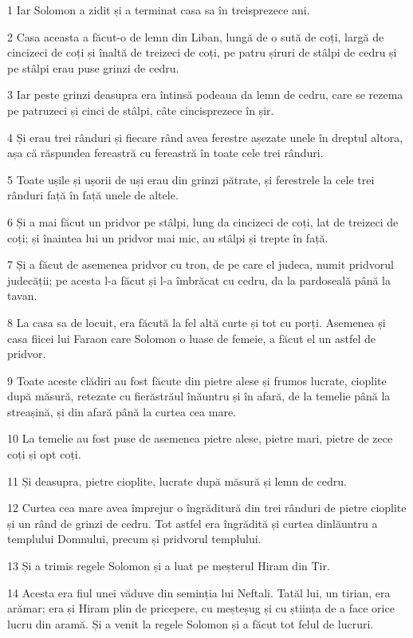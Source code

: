 \par 1 Iar Solomon a zidit și a terminat casa sa în treisprezece ani.
\par 2 Casa aceasta a făcut-o de lemn din Liban, lungă de o sută de coți, largă de cincizeci de coți și înaltă de treizeci de coți, pe patru șiruri de stâlpi de cedru și pe stâlpi erau puse grinzi de cedru.
\par 3 Iar peste grinzi deasupra era întinsă podeaua da lemn de cedru, care se rezema pe patruzeci și cinci de stâlpi, câte cincisprezece în șir.
\par 4 Și erau trei rânduri și fiecare rând avea ferestre așezate unele în dreptul altora, așa că răspundea fereastră cu fereastră în toate cele trei rânduri.
\par 5 Toate ușile și ușorii de uși erau din grinzi pătrate, și ferestrele la cele trei rânduri față în față unele de altele.
\par 6 Și a mai făcut un pridvor pe stâlpi, lung da cincizeci de coți, lat de treizeci de coți; și înaintea lui un pridvor mai mic, au stâlpi și trepte în față.
\par 7 Și a făcut de asemenea pridvor cu tron, de pe care el judeca, numit pridvorul judecății; pe acesta l-a făcut și l-a îmbrăcat cu cedru, da la pardoseală până la tavan.
\par 8 La casa sa de locuit, era făcută la fel altă curte și tot cu porți. Asemenea și casa fiicei lui Faraon care Solomon o luase de femeie, a făcut el un astfel de pridvor.
\par 9 Toate aceste clădiri au fost făcute din pietre alese și frumos lucrate, cioplite după măsură, retezate cu fierăstrăul înăuntru și în afară, de la temelie până la streașină, și din afară până la curtea cea mare.
\par 10 La temelie au fost puse de asemenea pietre alese, pietre mari, pietre de zece coți și opt coți.
\par 11 Și deasupra, pietre cioplite, lucrate după măsură și lemn de cedru.
\par 12 Curtea cea mare avea împrejur o îngrăditură din trei rânduri de pietre cioplite și un rând de grinzi de cedru. Tot astfel era îngrădită și curtea dinlăuntru a templului Domnului, precum și pridvorul templului.
\par 13 Și a trimis regele Solomon și a luat pe meșterul Hiram din Tir.
\par 14 Acesta era fiul unei văduve din seminția lui Neftali. Tatăl lui, un tirian, era arămar; era și Hiram plin de pricepere, cu meșteșug și cu știința de a face orice lucru din aramă. Și a venit la regele Solomon și a făcut tot felul de lucruri.
